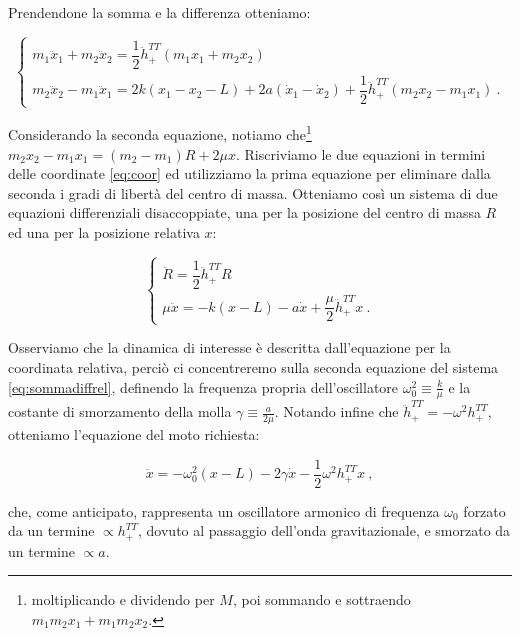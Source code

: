 \documentclass[a4paper,10pt]{article}
\begin{document}
Prendendone la somma e la differenza otteniamo:

\begin{equation} \label{eq:sommadiff}
    \begin{cases}
        m_1 \ddot x_1 + m_2 \ddot x_2 = \dfrac{1}{2} \ddot{h}_+^{TT} (m_1 x_1 + m_2 x_2) \\[2mm]
        m_2 \ddot x_2 - m_1 \ddot x_1 = 2k(x_1 - x_2 - L) + 2a(\dot x_1 - \dot x_2) + \dfrac{1}{2} \ddot{h}_+^{TT} (m_2 x_2 - m_1 x_1) \ .
    \end{cases}
\end{equation}

Considerando la seconda equazione, notiamo che\footnote{moltiplicando e dividendo per $M$, poi sommando e sottraendo $m_1 m_2 x_1 + m_1 m_2 x_2$.} $m_2 x_2 - m_1 x_1 = (m_2 - m_1)R + 2\mu x$.
Riscriviamo le due equazioni in termini delle coordinate \eqref{eq:coor} ed utilizziamo la prima equazione per eliminare dalla seconda i gradi di libertà del centro di massa.
Otteniamo così un sistema di due equazioni differenziali disaccoppiate, una per la posizione del centro di massa $R$ ed una per la posizione relativa $x$:

\begin{equation} \label{eq:sommadiffrel}
    \begin{cases}
        \ddot R = \dfrac{1}{2} \ddot{h}_+^{TT} R \\[2mm]
        \mu \ddot x = -k (x-L) - a \dot x + \dfrac{\mu}{2} \ddot{h}_+^{TT} x \ .
    \end{cases}
\end{equation}

Osserviamo che la dinamica di interesse è descritta dall'equazione per la coordinata relativa, perciò ci concentreremo sulla seconda equazione del sistema \eqref{eq:sommadiffrel}, definendo la frequenza propria dell'oscillatore $\omega_0^2 \equiv \frac{k}{\mu}$ e la costante di smorzamento della molla $\gamma \equiv \frac{a}{2\mu}$.
Notando infine che $\ddot{h}_+^{TT} = -\omega^2{h}_+^{TT}$, otteniamo l'equazione del moto richiesta:

\begin{equation} \label{eq:eqmoto}
    \ddot x = -\omega_0^2 (x-L) - 2\gamma \dot x - \frac{1}{2} \omega^2 h_+^{TT} x \ ,
\end{equation}

che, come anticipato, rappresenta un oscillatore armonico di frequenza $\omega_0$ forzato da un termine $\propto h_+^{TT}$, dovuto al passaggio dell'onda gravitazionale, e smorzato da un termine $\propto a$.
\end{document}
